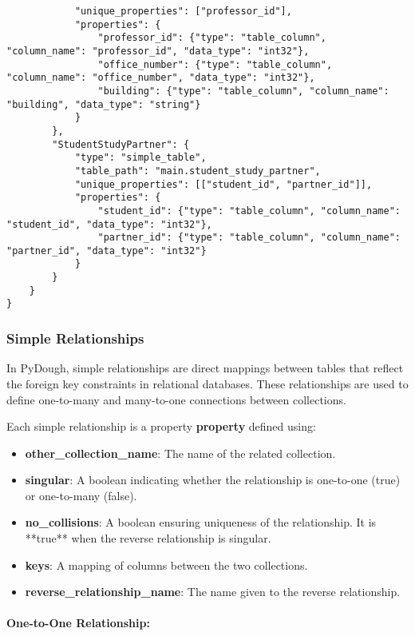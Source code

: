 \documentclass{article}
\begin{document}
\begin{verbatim}
            "unique_properties": ["professor_id"],
            "properties": {
                "professor_id": {"type": "table_column", "column_name": "professor_id", "data_type": "int32"},
                "office_number": {"type": "table_column", "column_name": "office_number", "data_type": "int32"},
                "building": {"type": "table_column", "column_name": "building", "data_type": "string"}
            }
        },
        "StudentStudyPartner": {
            "type": "simple_table",
            "table_path": "main.student_study_partner",
            "unique_properties": [["student_id", "partner_id"]],
            "properties": {
                "student_id": {"type": "table_column", "column_name": "student_id", "data_type": "int32"},
                "partner_id": {"type": "table_column", "column_name": "partner_id", "data_type": "int32"}
            }
        }
    }
}
\end{verbatim}

\subsubsection{Simple Relationships}
In PyDough, simple relationships are direct mappings between tables that reflect the foreign key constraints in relational databases. These relationships are used to define one-to-many and many-to-one connections between collections.

Each simple relationship is a  property \textbf{property} defined using:
\begin{itemize}
    \item \textbf{other\_collection\_name}: The name of the related collection.
    \item \textbf{singular}: A boolean indicating whether the relationship is one-to-one (true) or one-to-many (false).
    \item \textbf{no\_collisions}: A boolean ensuring uniqueness of the relationship. It is **true** when the reverse relationship is singular.
    \item \textbf{keys}: A mapping of columns between the two collections.
    \item \textbf{reverse\_relationship\_name}: The name given to the reverse relationship.
\end{itemize}

\paragraph{One-to-One Relationship:}
\end{document}
